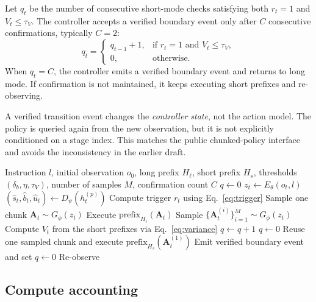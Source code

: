 \documentclass[10pt]{article}
\newcommand{\method}{\textsc{PACT-V}\xspace}
\newcommand{\Hs}{H_s}
\newcommand{\Hl}{H_\ell}
\newcommand{\Msamples}{M}
\begin{document}
Let $q_t$ be the number of consecutive short-mode checks satisfying both
$r_t=1$ and $V_t\le\tau_V$.
The controller accepts a verified boundary event only after $C$ consecutive
confirmations, typically $C=2$:
\begin{equation}
  q_t =
  \begin{cases}
    q_{t-1}+1, & \text{if } r_t=1 \text{ and } V_t\le\tau_V,\\
    0, & \text{otherwise.}
  \end{cases}
  \label{eq:confirm}
\end{equation}
When $q_t=C$, the controller emits a verified boundary event and returns to
long mode.
If confirmation is not maintained, it keeps executing short prefixes and
re-observing.

A verified transition event changes the \emph{controller state}, not the action
model.
The policy is queried again from the new observation, but it is not explicitly
conditioned on a stage index.
This matches the public chunked-policy interface and avoids the inconsistency in
the earlier draft.

\begin{algorithm}[t]
\caption{\method\ inference controller}
\label{alg:inference}
\begin{algorithmic}[1]
\Require Instruction $l$, initial observation $o_0$, long prefix $\Hl$, short prefix $\Hs$,
         thresholds $(\delta_b,\eta,\tau_V)$, number of samples $\Msamples$,
         confirmation count $C$
\State $q \gets 0$
  \State $z_t \gets E_\theta(o_t,l)$
  \State $(\hat s_t,\hat b_t,\hat u_t) \gets D_\psi(h_t^{(p)})$
  \State Compute trigger $r_t$ using Eq.~\eqref{eq:trigger}
    \State Sample one chunk $\mathbf{A}_t \sim G_\phi(z_t)$
    \State Execute $\mathrm{prefix}_{\Hl}(\mathbf{A}_t)$
  \Else
    \State Sample $\{\mathbf{A}_t^{(i)}\}_{i=1}^{\Msamples} \sim G_\phi(z_t)$
    \State Compute $V_t$ from the short prefixes via Eq.~\eqref{eq:variance}
      \State $q \gets q+1$
    \Else
      \State $q \gets 0$
    \EndIf
    \State Reuse one sampled chunk and execute $\mathrm{prefix}_{\Hs}(\mathbf{A}_t^{(1)})$
      \State Emit verified boundary event and set $q \gets 0$
    \EndIf
  \EndIf
  \State Re-observe
\EndWhile
\end{algorithmic}
\end{algorithm}

\subsection{Compute accounting}
\end{document}
